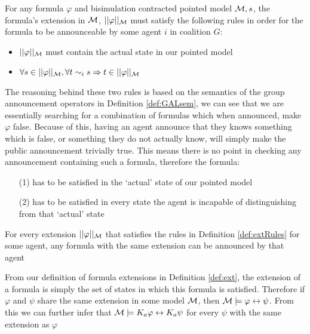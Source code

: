 
\begin{definition}\hfill
\label{def:extRules}
	For any formula $\varphi$ and bisimulation contracted pointed model $\mathcal{M},s$, the formula's extension in $\mathcal{M}$, $||\varphi||_{\mathcal{M}}$ must satisfy the following rules in order for the formula to be announceable by some agent $i$ in coalition $G$:
	\begin{itemize}
		\item $||\varphi||_{\mathcal{M}}$ must contain the actual state in our pointed model
		\item $\forall s\in||\varphi||_{\mathcal{M}}, \forall t\sim_i s \Rightarrow t\in||\varphi||_{\mathcal{M}}$
	\end{itemize}
\end{definition}

The reasoning behind these two rules is based on the semantics of the group announcement operators in Definition \ref{def:GALsem}, we can see that we are essentially searching for a combination of formulas which when announced, make $\varphi$ false. Because of this, having an agent announce that they knows something which is false, or something they do not actually know, will simply make the public announcement trivially true. This means there is no point in checking any announcement containing such a formula, therefore the formula:

\begin{itemize}
	\item[(1)] has to be satisfied in the `actual' state of our pointed model
	\item[(2)] has to be satisfied in every state the agent is incapable of distinguishing from that `actual' state
\end{itemize}

\begin{proposition}
For every extension $||\varphi||_{\mathcal{M}}$ that satisfies the rules in Definition \ref{def:extRules} for some agent, any formula with the same extension can be announced by that agent
\end{proposition}

From our definition of formula extensions in Definition \ref{def:ext}, the extension of a formula is simply the set of states in which this formula is satisfied. Therefore if $\varphi$ and $\psi$ share the same extension in some model $\mathcal{M}$, then $\mathcal{M}\models\varphi \leftrightarrow \psi$. From this we can further infer that $\mathcal{M}\models K_a\varphi \leftrightarrow K_a\psi$ for every $\psi$ with the same extension as $\varphi$


